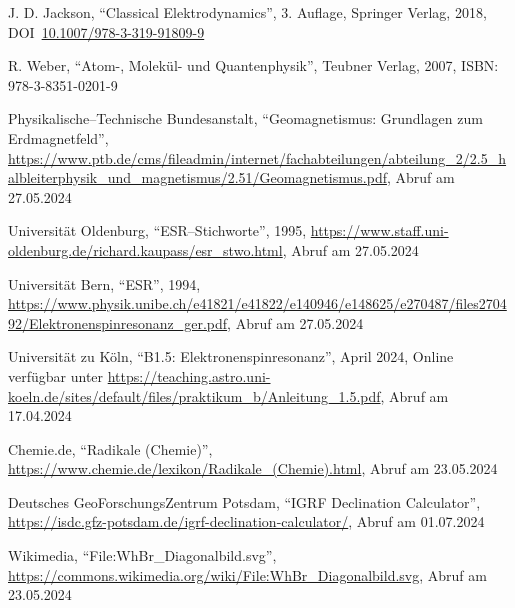 \documentclass[12pt,a4paper]{scrartcl}
\numberwithin{equation}{section} %
\begin{document}
\begin{thebibliography}{99}
	J. D. Jackson, ``Classical Elektrodynamics'', 3. Auflage, Springer Verlag, 2018,
	DOI~\href{https://doi.org/10.1007/978-3-319-91809-9}{10.1007/978-3-319-91809-9}
	
	R. Weber,  ``Atom-, Molekül- und Quantenphysik'', Teubner Verlag, 2007,
	ISBN: 978-3-8351-0201-9

	Physikalische--Technische Bundesanstalt, ``Geomagnetismus: Grundlagen zum Erdmagnetfeld'', \url{https://www.ptb.de/cms/fileadmin/internet/fachabteilungen/abteilung_2/2.5_halbleiterphysik_und_magnetismus/2.51/Geomagnetismus.pdf}, Abruf am 27.05.2024
	
	Universität Oldenburg, ``ESR--Stichworte'', 1995,
	\url{https://www.staff.uni-oldenburg.de/richard.kaupass/esr_stwo.html},
	Abruf am 27.05.2024
	
	Universität Bern, ``ESR'', 1994, \url{https://www.physik.unibe.ch/e41821/e41822/e140946/e148625/e270487/files270492/Elektronenspinresonanz_ger.pdf},
	Abruf am 27.05.2024

	Universität zu Köln, ``B1.5: Elektronenspinresonanz'', April 2024, Online verfügbar unter
	\url{https://teaching.astro.uni-koeln.de/sites/default/files/praktikum_b/Anleitung_1.5.pdf},
	Abruf am 17.04.2024

	Chemie.de, ``Radikale (Chemie)'',
	\url{https://www.chemie.de/lexikon/Radikale_(Chemie).html}, Abruf am 23.05.2024

	Deutsches GeoForschungsZentrum Potsdam, ``IGRF Declination Calculator'',
	\url{https://isdc.gfz-potsdam.de/igrf-declination-calculator/}, Abruf am 01.07.2024

	Wikimedia, ``File:WhBr\_Diagonalbild.svg'',
	\url{https://commons.wikimedia.org/wiki/File:WhBr_Diagonalbild.svg},
	Abruf am 23.05.2024

\end{thebibliography}
\end{document}
